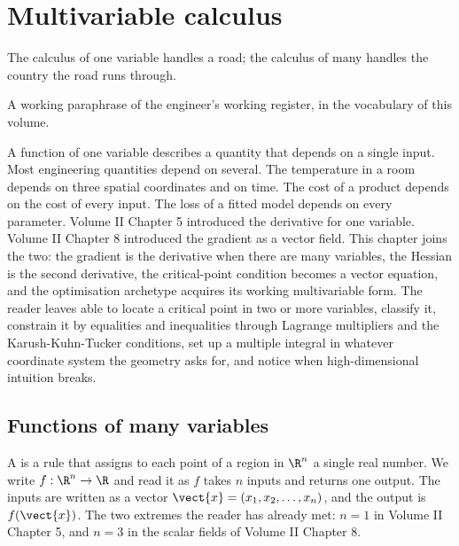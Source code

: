 \chapter{Multivariable calculus}
\label{vol02:ch11}

\epigraph{The calculus of one variable handles a road; the calculus
of many handles the country the road runs through.}{A working
paraphrase of the engineer's working register, in the vocabulary of
this volume.}


\noindent
A function of one variable describes a quantity that depends on a
single input. Most engineering quantities depend on several. The
temperature in a room depends on three spatial coordinates and on
time. The cost of a product depends on the cost of every input. The
loss of a fitted model depends on every parameter. Volume II
Chapter 5 introduced the derivative for one variable. Volume II
Chapter 8 introduced the gradient as a vector field. This chapter
joins the two: the gradient is the derivative when there are many
variables, the Hessian is the second derivative, the critical-point
condition becomes a vector equation, and the optimisation archetype
acquires its working multivariable form. The reader leaves able to
locate a critical point in two or more variables, classify it,
constrain it by equalities and inequalities through Lagrange
multipliers and the Karush-Kuhn-Tucker conditions, set up a multiple
integral in whatever coordinate system the geometry asks for, and
notice when high-dimensional intuition breaks.

\section{Functions of many variables}

A  is a rule that assigns to
each point of a region in $\R^{n}$ a single real number. We write
$f : \R^{n} \to \R$ and read it as $f$ takes $n$ inputs and returns
one output. The inputs are written as a vector $\vect{x} = (x_{1},
x_{2}, \ldots, x_{n})$, and the output is $f(\vect{x})$. The two
extremes the reader has already met: $n = 1$ in Volume II
Chapter 5, and $n = 3$ in the scalar fields of Volume II
Chapter 8.

